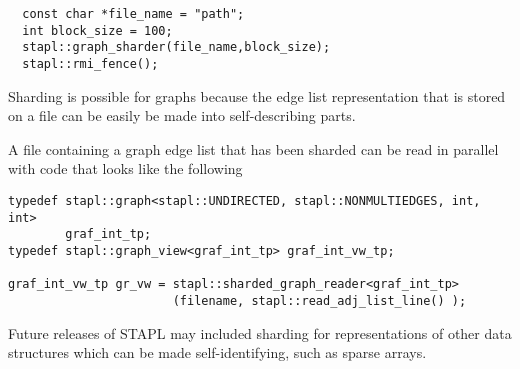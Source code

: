 \begin{verbatim}
  const char *file_name = "path";
  int block_size = 100;
  stapl::graph_sharder(file_name,block_size);
  stapl::rmi_fence();
\end{verbatim}

Sharding is possible for graphs because the edge list representation
that is stored on a file can be easily be made into self-describing parts.

A file containing a graph edge list that has been sharded can be read
in parallel with code that looks like the following

\begin{verbatim}
typedef stapl::graph<stapl::UNDIRECTED, stapl::NONMULTIEDGES, int, int>
        graf_int_tp;
typedef stapl::graph_view<graf_int_tp> graf_int_vw_tp;

graf_int_vw_tp gr_vw = stapl::sharded_graph_reader<graf_int_tp>
                       (filename, stapl::read_adj_list_line() );
\end{verbatim}

Future releases of STAPL may included sharding for representations of
other data structures which can be made self-identifying, such as sparse arrays.
